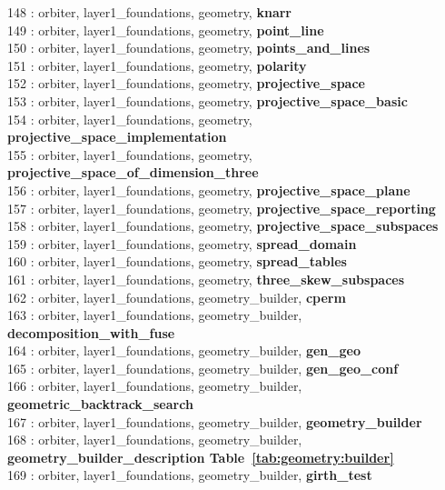 148 : orbiter, layer1\_foundations, geometry, {\bf knarr}\\
149 : orbiter, layer1\_foundations, geometry, {\bf point\_line}\\
150 : orbiter, layer1\_foundations, geometry, {\bf points\_and\_lines}\\
151 : orbiter, layer1\_foundations, geometry, {\bf polarity}\\
152 : orbiter, layer1\_foundations, geometry, {\bf projective\_space}\\
153 : orbiter, layer1\_foundations, geometry, {\bf projective\_space\_basic}\\
154 : orbiter, layer1\_foundations, geometry, {\bf projective\_space\_implementation}\\
155 : orbiter, layer1\_foundations, geometry, {\bf projective\_space\_of\_dimension\_three}\\
156 : orbiter, layer1\_foundations, geometry, {\bf projective\_space\_plane}\\
157 : orbiter, layer1\_foundations, geometry, {\bf projective\_space\_reporting}\\
158 : orbiter, layer1\_foundations, geometry, {\bf projective\_space\_subspaces}\\
159 : orbiter, layer1\_foundations, geometry, {\bf spread\_domain}\\
160 : orbiter, layer1\_foundations, geometry, {\bf spread\_tables}\\
161 : orbiter, layer1\_foundations, geometry, {\bf three\_skew\_subspaces}\\
162 : orbiter, layer1\_foundations, geometry\_builder, {\bf cperm}\\
163 : orbiter, layer1\_foundations, geometry\_builder, {\bf decomposition\_with\_fuse}\\
164 : orbiter, layer1\_foundations, geometry\_builder, {\bf gen\_geo}\\
165 : orbiter, layer1\_foundations, geometry\_builder, {\bf gen\_geo\_conf}\\
166 : orbiter, layer1\_foundations, geometry\_builder, {\bf geometric\_backtrack\_search}\\
167 : orbiter, layer1\_foundations, geometry\_builder, {\bf geometry\_builder}\\
168 : orbiter, layer1\_foundations, geometry\_builder, {\bf geometry\_builder\_description Table~\ref{tab:geometry:builder}}\\
169 : orbiter, layer1\_foundations, geometry\_builder, {\bf girth\_test}\\
